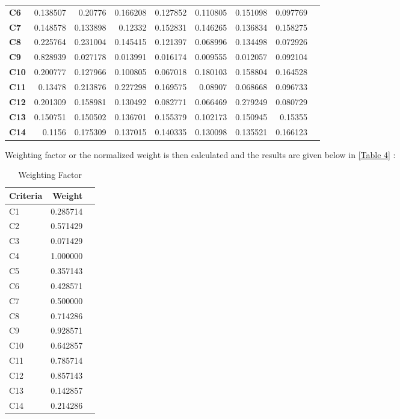 \documentclass{infor}
\theoremstyle{remark}
\begin{document}
\begin{steps}
\begin{table}[!htp]
\begin{tabular}{lrrrrrrrr}
\textbf{C6} &0.138507 &0.20776 &0.166208 &0.127852 &0.110805 &0.151098 &0.097769 \\
\textbf{C7} &0.148578 &0.133898 &0.12332 &0.152831 &0.146265 &0.136834 &0.158275 \\
\textbf{C8} &0.225764 &0.231004 &0.145415 &0.121397 &0.068996 &0.134498 &0.072926 \\
\textbf{C9} &0.828939 &0.027178 &0.013991 &0.016174 &0.009555 &0.012057 &0.092104 \\
\textbf{C10} &0.200777 &0.127966 &0.100805 &0.067018 &0.180103 &0.158804 &0.164528 \\
\textbf{C11} &0.13478 &0.213876 &0.227298 &0.169575 &0.08907 &0.068668 &0.096733 \\
\textbf{C12} &0.201309 &0.158981 &0.130492 &0.082771 &0.066469 &0.279249 &0.080729 \\
\textbf{C13} &0.150751 &0.150502 &0.136701 &0.155379 &0.102173 &0.150945 &0.15355 \\
\textbf{C14} &0.1156 &0.175309 &0.137015 &0.140335 &0.130098 &0.135521 &0.166123 \\
\bottomrule
\end{tabular}
\end{table}
\item Weighting factor or the normalized weight is then calculated and the
results are given below in \autoref{Table 4} :

\begin{table}[!htp]\centering
\caption{Weighting Factor}\label{Table 4}
\scriptsize
\begin{tabular}{lrr}\toprule

Criteria & Weight\tabularnewline \toprule
C1 & 0.285714\\
C2 & 0.571429\\
C3 & 0.071429\\
C4 & 1.000000\\
C5 & 0.357143\\
C6 & 0.428571\\
C7 & 0.500000\\
C8 & 0.714286\\
C9 & 0.928571\\
C10 & 0.642857\\
C11 & 0.785714\\
C12 & 0.857143\\
C13 & 0.142857\\
C14 & 0.214286\\
\bottomrule
\end{tabular}
\end{table}


\end{steps}
\end{document}
